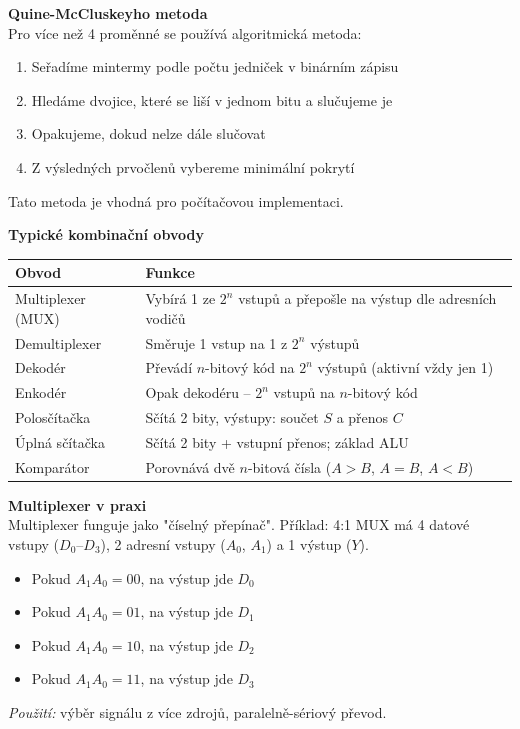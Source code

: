 \documentclass[a4paper,10pt]{article}
\begin{document}
\begin{vysvetlenibox}
\textbf{Quine-McCluskeyho metoda}\\
Pro více než 4 proměnné se používá algoritmická metoda:
\begin{enumerate}[noitemsep, leftmargin=1.4em, topsep=4pt]
    \item Seřadíme mintermy podle počtu jedniček v binárním zápisu
    \item Hledáme dvojice, které se liší v jednom bitu a slučujeme je
    \item Opakujeme, dokud nelze dále slučovat
    \item Z výsledných prvočlenů vybereme minimální pokrytí
\end{enumerate}
Tato metoda je vhodná pro počítačovou implementaci.

\textbf{Typické kombinační obvody}

\begin{center}
\begin{tabularx}{0.95\linewidth}{@{} l X @{}}
    \toprule
    \textbf{Obvod}    & \textbf{Funkce} \\
    \midrule
    Multiplexer (MUX) & Vybírá 1 ze $2^n$ vstupů a přepošle na výstup dle adresních vodičů \\
    Demultiplexer     & Směruje 1 vstup na 1 z $2^n$ výstupů \\
    Dekodér           & Převádí $n$-bitový kód na $2^n$ výstupů (aktivní vždy jen 1) \\
    Enkodér           & Opak dekodéru -- $2^n$ vstupů na $n$-bitový kód \\
    Polosčítačka      & Sčítá 2 bity, výstupy: součet $S$ a přenos $C$ \\
    Úplná sčítačka    & Sčítá 2 bity + vstupní přenos; základ ALU \\
    Komparátor        & Porovnává dvě $n$-bitová čísla ($A>B$, $A=B$, $A<B$) \\
    \bottomrule
\end{tabularx}
\end{center}

\textbf{Multiplexer v praxi}\\
Multiplexer funguje jako "číselný přepínač". Příklad: 4:1 MUX má 4 datové vstupy
($D_0$--$D_3$), 2 adresní vstupy ($A_0$, $A_1$) a 1 výstup ($Y$).
\begin{itemize}[noitemsep, leftmargin=1.4em, topsep=4pt]
    \item Pokud $A_1A_0 = 00$, na výstup jde $D_0$
    \item Pokud $A_1A_0 = 01$, na výstup jde $D_1$
    \item Pokud $A_1A_0 = 10$, na výstup jde $D_2$
    \item Pokud $A_1A_0 = 11$, na výstup jde $D_3$
\end{itemize}
\textit{Použití:} výběr signálu z více zdrojů, paralelně-sériový převod.


\end{vysvetlenibox}
\end{document}
